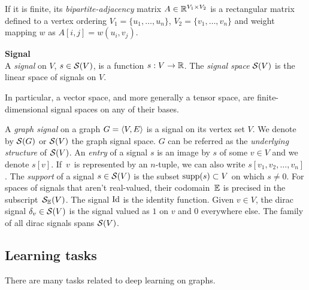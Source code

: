 If it is finite, its \emph{bipartite-adjacency} matrix $A \in \mathbb{R}^{V_1 \times V_2}$ is a rectangular matrix defined \wrt to a vertex ordering $V_1 = \{u_1, \ldots, u_n\}$, $V_2 = \{v_1, \ldots, v_n\}$ and weight mapping $w$ as $A[i,j] = w(u_i,v_j)$.

\begin{definition}\textbf{Signal}\\
A \emph{signal} on $V$, $s \in \mathcal{S}(V)$, is a function $s: V \rightarrow \mathbb{R}$.
The \emph{signal space} $\mathcal{S}(V)$ is the linear space of signals on $V$.
\end{definition}

\begin{remark}
In particular, a vector space, and more generally a tensor space, are finite-dimensional signal spaces on any of their bases.
\end{remark}

A \emph{graph signal} on a graph $G = \langle V, E \rangle$ is a signal on its vertex set $V$. We denote by $\mathcal{S}(G)$ or $\mathcal{S}(V)$ the graph signal space. $G$ can be referred as the \emph{underlying structure} of $\mathcal{S}(V)$.
An \emph{entry} of a signal $s$ is an image by $s$ of some $v \in V$ and we denote $s[v]$. If~$v$~is represented by an $n$-tuple, we can also write $s[v_1, v_2, \ldots, v_n]$.
The \emph{support} of a signal $s \in \mathcal{S}(V)$ is the subset $\operatorname{supp}(s) \subset V$ on which $s \neq 0$.
For spaces of signals that aren't real-valued, their codomain~$\mathbb{E}$ is precised in the subscript~$\mathcal{S}_{\mathbb{E}}(V)$.
The signal $\operatorname{Id}$ is the identity function.
Given $v \in V$, the dirac signal $\delta_v \in \mathcal{S}(V)$ is the signal valued as $1$ on $v$ and $0$ everywhere else. The family of all dirac signals spans $\mathcal{S}(V)$.

\subsection{Learning tasks}

There are many tasks related to deep learning on graphs.%

